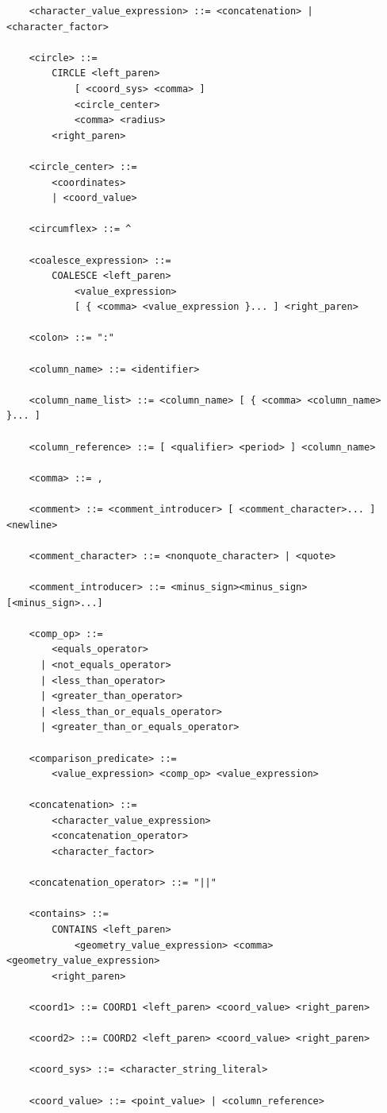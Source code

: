 \documentclass[11pt,a4paper]{ivoa}
\begin{document}
\begin{verbatim}
    <character_value_expression> ::= <concatenation> | <character_factor>

    <circle> ::=
        CIRCLE <left_paren>
            [ <coord_sys> <comma> ]
            <circle_center>
            <comma> <radius>
        <right_paren>
    
    <circle_center> ::=
        <coordinates>
        | <coord_value>

    <circumflex> ::= ^

    <coalesce_expression> ::= 
        COALESCE <left_paren>
            <value_expression>
            [ { <comma> <value_expression }... ] <right_paren>

    <colon> ::= ":"

    <column_name> ::= <identifier>

    <column_name_list> ::= <column_name> [ { <comma> <column_name> }... ]

    <column_reference> ::= [ <qualifier> <period> ] <column_name>

    <comma> ::= ,

    <comment> ::= <comment_introducer> [ <comment_character>... ] <newline>

    <comment_character> ::= <nonquote_character> | <quote>

    <comment_introducer> ::= <minus_sign><minus_sign> [<minus_sign>...]

    <comp_op> ::=
        <equals_operator>
      | <not_equals_operator>
      | <less_than_operator>
      | <greater_than_operator>
      | <less_than_or_equals_operator>
      | <greater_than_or_equals_operator>

    <comparison_predicate> ::=
        <value_expression> <comp_op> <value_expression>

    <concatenation> ::=
        <character_value_expression>
        <concatenation_operator>
        <character_factor>

    <concatenation_operator> ::= "||"

    <contains> ::=
        CONTAINS <left_paren>
            <geometry_value_expression> <comma> <geometry_value_expression>
        <right_paren>

    <coord1> ::= COORD1 <left_paren> <coord_value> <right_paren>

    <coord2> ::= COORD2 <left_paren> <coord_value> <right_paren>

    <coord_sys> ::= <character_string_literal>

    <coord_value> ::= <point_value> | <column_reference>


\end{verbatim}
\end{document}
